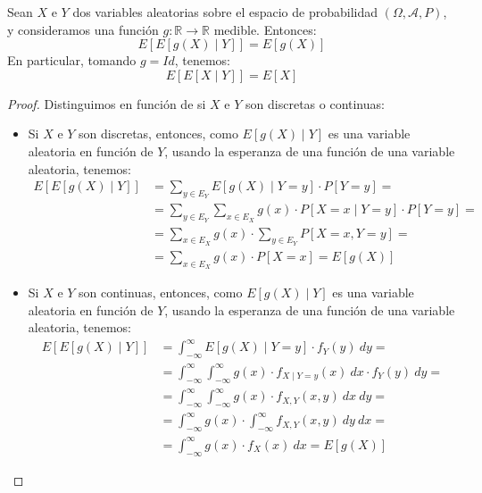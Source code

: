 \begin{prop}
    Sean $X$ e $Y$ dos variables aleatorias sobre el espacio de probabilidad $(\Omega, \mathcal{A}, P)$, y consideramos una función $g:\mathbb{R}\to\mathbb{R}$ medible. Entonces:
    \begin{equation*}
        E[E[g(X)\mid Y]] = E[g(X)]
    \end{equation*}
    En particular, tomando $g=Id$, tenemos:
    \begin{equation*}
        E[E[X\mid Y]] = E[X]
    \end{equation*}
\end{prop}
\begin{proof}
    Distinguimos en función de si $X$ e $Y$ son discretas o continuas:
    \begin{itemize}
        \item Si $X$ e $Y$ son discretas, entonces, como $E[g(X)\mid Y]$ es una variable aleatoria en función de $Y$, usando la esperanza de una función de una variable aleatoria, tenemos:
        \begin{align*}
            E[E[g(X)\mid Y]] &= \sum_{y\in E_Y} E[g(X)\mid Y = y]\cdot P[Y = y] =\\&= \sum_{y\in E_Y} \sum_{x\in E_X} g(x)\cdot P[X = x\mid Y = y]\cdot P[Y = y] =\\&= \sum_{x\in E_X} g(x)\cdot \sum_{y\in E_Y} P[X = x, Y = y] =\\&= \sum_{x\in E_X} g(x)\cdot P[X = x] = E[g(X)]
        \end{align*}

        \item Si $X$ e $Y$ son continuas, entonces, como $E[g(X)\mid Y]$ es una variable aleatoria en función de $Y$, usando la esperanza de una función de una variable aleatoria, tenemos:
        \begin{align*}
            E[E[g(X)\mid Y]] &= \int_{-\infty}^{\infty} E[g(X)\mid Y = y]\cdot f_Y(y)~dy =\\&= \int_{-\infty}^{\infty} \int_{-\infty}^{\infty} g(x)\cdot f_{X\mid Y=y}(x)~dx\cdot f_Y(y)~dy =\\&= \int_{-\infty}^{\infty} \int_{-\infty}^{\infty} g(x)\cdot f_{X,Y}(x,y)~dx~dy =\\&= \int_{-\infty}^{\infty} g(x)\cdot \int_{-\infty}^{\infty} f_{X,Y}(x,y)~dy~dx =\\&= \int_{-\infty}^{\infty} g(x)\cdot f_X(x)~dx = E[g(X)]
        \end{align*}
    \end{itemize}
\end{proof}